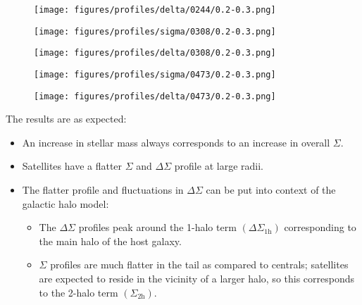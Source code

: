 \documentclass{beamer}
\begin{document}
  \begin{frame}
    \begin{figure}[H]
      \centering
      \texttt{[image: figures/profiles/delta/0244/0.2-0.3.png]}
    \end{figure}
  \end{frame}

  \begin{frame}
    \begin{figure}[H]
      \centering
      \texttt{[image: figures/profiles/sigma/0308/0.2-0.3.png]}
    \end{figure}
  \end{frame}

  \begin{frame}
    \begin{figure}[H]
      \centering
      \texttt{[image: figures/profiles/delta/0308/0.2-0.3.png]}
    \end{figure}
  \end{frame}

  \begin{frame}
    \begin{figure}[H]
      \centering
      \texttt{[image: figures/profiles/sigma/0473/0.2-0.3.png]}
    \end{figure}
  \end{frame}

  \begin{frame}
    \begin{figure}[H]
      \centering
      \texttt{[image: figures/profiles/delta/0473/0.2-0.3.png]}
    \end{figure}
  \end{frame}

  \begin{frame}
    The results are as expected:
    \begin{itemize}
      \item An increase in stellar mass always corresponds to an increase in overall $\Sigma.$
      \item Satellites have a flatter $\Sigma$ and $\Delta\Sigma$ profile at large radii.
      \item The flatter profile and fluctuations in $\Delta\Sigma$ can be put into context of the galactic halo model:
      \begin{itemize}
        \item The $\Delta\Sigma$ profiles peak around the 1-halo term $\left( \Delta\Sigma_{\text{1h}} \right)$ corresponding to the main halo of the host galaxy.
        \item $\Sigma$ profiles are much flatter in the tail as compared to centrals; satellites are expected to reside in the vicinity of a larger halo, so this corresponds to the 2-halo term $\left( \Sigma_{\text{2h}} \right)$.
      \end{itemize}
    \end{itemize}
  \end{frame}
\end{document}
